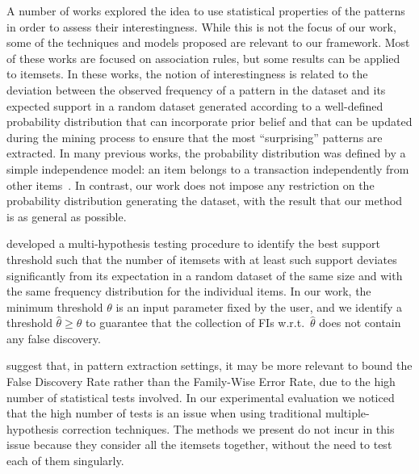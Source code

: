 A number of works explored the idea to use statistical properties of the
patterns in order to assess their interestingness. While this is not the focus of our work,
some of the techniques and models proposed are relevant to our framework.
Most of these works are
focused on association rules, but some results can be applied to itemsets. In
these works, the notion of interestingness is related to the deviation between
the observed frequency of a pattern in the dataset and its expected support in a
random dataset generated according to a well-defined probability distribution that can incorporate
prior belief and that can be updated during the mining process to ensure that
the most ``surprising'' patterns are extracted. In many previous works, the
probability distribution was defined by a simple independence model: an item belongs to a
transaction independently from other
items~\citep{SilversteinBM98,MegiddoS98,DuMouchelP01,GionisMMT07,Hamalainen10,KirschMAPUV12}.
In contrast, our work does not impose any
restriction on the probability distribution generating the dataset, with the result that our method is as general as
possible.

\citet{KirschMAPUV12} developed a multi-hypothesis
testing procedure to identify the best support threshold such that the number of
itemsets with at least such support deviates significantly from its expectation
in a random dataset of the same size and with the same frequency distribution
for the individual items. In our work, the minimum threshold $\theta$ is an input
parameter fixed by the user, and we identify a threshold $\hat{\theta}\ge\theta$
to guarantee that the collection of FIs w.r.t.~$\hat{\theta}$ does not contain
any false discovery.

\iffalse
\citet{BoltonHA02} suggest that, in pattern extraction settings,
it may be more relevant to bound the False Discovery Rate rather
than the Family-Wise Error Rate, due to the high number of statistical tests
involved. In our experimental evaluation we noticed that the high number of
tests is an issue when using traditional multiple-hypothesis correction
techniques. The methods we present do not incur in this issue because they
consider all the itemsets together, without the need to test each of them
singularly.

